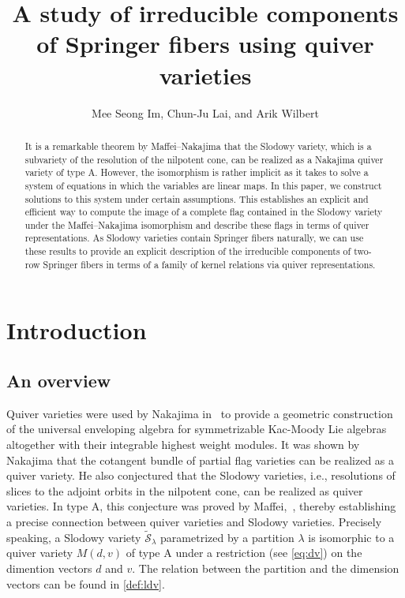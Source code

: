 \documentclass[11pt,reqno]{amsart}
\title{A study of irreducible components of Springer fibers using quiver varieties}
\author[M.S. Im, C.-J. Lai, and A. Wilbert]{Mee Seong Im,  Chun-Ju Lai, and Arik Wilbert}
\numberwithin{equation}{section}
\theoremstyle{definition}
\newcommand{\cS}{\mathcal{S}}
\newcommand{\ld}{\lambda}
\newcommand{\tcS}{\widetilde{\cS}}
\begin{document}
\begin{abstract}
It is a remarkable theorem by Maffei--Nakajima that the Slodowy variety, which is a subvariety of the resolution of the nilpotent cone, can be realized as a Nakajima quiver variety of type A.
However, the isomorphism is rather implicit as it takes to solve a system of equations in which the variables are linear maps.
In this paper, we construct solutions to this system under certain assumptions.
This establishes an explicit and efficient way to compute the image of a complete flag contained in the Slodowy variety under the Maffei--Nakajima isomorphism and describe these flags in terms of quiver representations. 
As Slodowy varieties contain Springer fibers naturally,
we can use these results to provide an explicit description of the irreducible components of two-row Springer fibers in terms of a family of kernel relations via quiver representations.
\end{abstract}
 
\maketitle 

\section{Introduction}

\subsection{An overview} \label{sec:background}
Quiver varieties were used by 
Nakajima in~\cite{Na94, Nak98} to provide a geometric construction of the universal enveloping algebra for symmetrizable Kac-Moody Lie algebras altogether with their integrable highest weight modules.  
It was shown by Nakajima that the cotangent bundle of partial flag varieties can be realized as a quiver variety.
He also conjectured that the Slodowy varieties, i.e., resolutions of slices to the adjoint orbits in the nilpotent cone, can be realized as quiver varieties.
In type A, this conjecture was proved by Maffei,~\cite[Theorem~8]{Maf05}, 
thereby establishing a precise connection between quiver varieties and Slodowy varieties. 
Precisely speaking, a Slodowy variety $\tcS_\ld$ parametrized by a partition $\ld$ is isomorphic to a quiver variety $M(d,v)$ of type A under a restriction (see \eqref{eq:dv}) on the dimention vectors $d$ and $v$. The relation between the partition and the dimension vectors can be found in \eqref{def:ldv}. 
\end{document}
